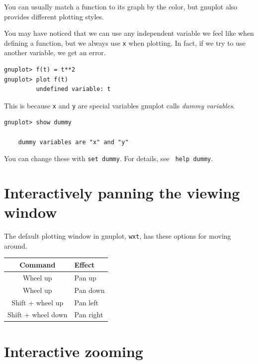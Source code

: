 \documentclass[11pt,letterpaper]{report}
\begin{document}

You can usually match a function to its graph by the color, but gnuplot also provides different plotting styles.


You may have noticed that we can use any independent variable we feel like when defining a function, but we always use \verb+x+ when plotting. In fact, if we try to use another variable, we get an error.
\begin{verbatim}
gnuplot> f(t) = t**2
gnuplot> plot f(t)
         undefined variable: t

\end{verbatim}

This is because \verb+x+ and \verb+y+ are special variables gnuplot calls \emph{dummy variables}.

\begin{verbatim}
gnuplot> show dummy

	dummy variables are "x" and "y"

\end{verbatim}

You can change these with \verb+set dummy+. For details, see \verb+ help dummy+.


\section{Interactively panning the viewing window}

The default plotting window in gnuplot, \verb+wxt+, has these options for moving around.

\begin{center}
	\begin{tabular}{|c|l|}
	\hline 
	Command & Effect \\
	\hline
	Wheel up & Pan up \\
	\hline
	Wheel up & Pan down \\
	\hline
	Shift + wheel up & Pan left \\
	\hline
	Shift + wheel down & Pan right \\
	\hline
	\end{tabular}
\end{center}



\section{Interactive zooming}
\end{document}
